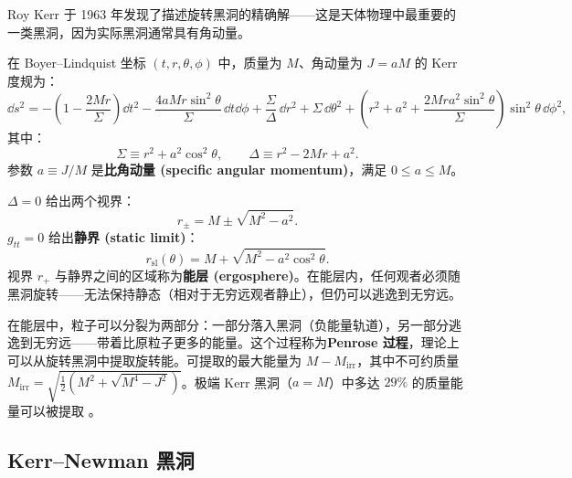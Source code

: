 Roy Kerr 于 1963 年发现了描述旋转黑洞的精确解——这是天体物理中最重要的一类黑洞，因为实际黑洞通常具有角动量。

\begin{definition}
在 Boyer–Lindquist 坐标 $(t,r,\theta,\phi)$ 中，质量为 $M$、角动量为 $J = aM$ 的 Kerr 度规为：
\begin{equation}
    \boxed{\dd s^2 = -\left(1-\frac{2Mr}{\Sigma}\right)\dd t^2 - \frac{4aMr\sin^2\theta}{\Sigma}\,\dd t\dd\phi + \frac{\Sigma}{\Delta}\,\dd r^2 + \Sigma\,\dd\theta^2 + \left(r^2+a^2+\frac{2Mra^2\sin^2\theta}{\Sigma}\right)\sin^2\theta\,\dd\phi^2},
    \label{eq:Kerr_metric}
\end{equation}
其中：
\begin{equation}
    \Sigma \equiv r^2 + a^2\cos^2\theta, \qquad \Delta \equiv r^2 - 2Mr + a^2.
\end{equation}
参数 $a \equiv J/M$ 是\textbf{比角动量 (specific angular momentum)}，满足 $0 \leq a \leq M$。
\end{definition}

\begin{theorem}
$\Delta = 0$ 给出两个视界：
\begin{equation}
    r_\pm = M \pm \sqrt{M^2 - a^2}.
\end{equation}
$g_{tt}=0$ 给出\textbf{静界 (static limit)}：
\begin{equation}
    r_{\text{sl}}(\theta) = M + \sqrt{M^2 - a^2\cos^2\theta}.
\end{equation}
视界 $r_+$ 与静界之间的区域称为\textbf{能层 (ergosphere)}。在能层内，任何观者必须随黑洞旋转——无法保持静态（相对于无穷远观者静止），但仍可以逃逸到无穷远。
\end{theorem}

\begin{note}
在能层中，粒子可以分裂为两部分：一部分落入黑洞（负能量轨道），另一部分逃逸到无穷远——带着比原粒子更多的能量。这个过程称为\textbf{Penrose 过程}，理论上可以从旋转黑洞中提取旋转能。可提取的最大能量为 $M - M_{\text{irr}}$，其中不可约质量 $M_{\text{irr}} = \sqrt{\frac{1}{2}(M^2 + \sqrt{M^4 - J^2})}$。极端 Kerr 黑洞（$a=M$）中多达 $29\%$ 的质量能量可以被提取 \cite{Misner1973}。
\end{note}

\subsection{Kerr–Newman 黑洞}

